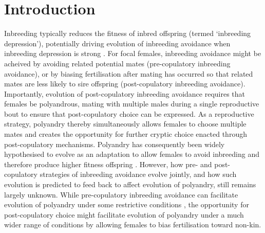 \documentclass[10pt,letterpaper]{article}
\begin{document}
\section*{Introduction}

Inbreeding typically reduces the fitness of inbred offspring (termed `inbreeding depression'), potentially driving evolution of inbreeding avoidance when inbreeding depression is strong \cite[][]{Parker1979, Parker2006, Pusey1996, Charlesworth1999, Keller2002, Charlesworth2009, Szulkin2012}. For focal females, inbreeding avoidance might be acheived by avoiding related potential mates (pre-copulatory inbreeding avoidance), or by biasing fertilisation after mating has occurred so that related mates are less likely to sire offspring (post-copulatory inbreeding avoidance). Importantly, evolution of post-copulatory inbreeding avoidance requires that females be polyandrous, mating with multiple males during a single reproductive bout to ensure that post-copulatory choice can be expressed. As a reproductive strategy, polyandry thereby simultaneously allows females to choose multiple mates and creates the opportunity for further cryptic choice enacted through post-copulatory mechanisms. Polyandry has consequently been widely hypothesised to evolve as an adaptation to allow females to avoid inbreeding and therefore produce higher fitness offspring \cite[][]{Zeh1997, Jennions2000, Tregenza2002, Akcay2007}. However, how pre- and post-copulatory strategies of inbreeding avoidance evolve jointly, and how such evolution is predicted to feed back to affect evolution of polyandry, still remains largely unknown. While pre-copulatory inbreeding avoidance can facilitate evolution of polyandry under some restrictive conditions \cite[][]{Duthie}, the opportunity for post-copulatory choice might facilitate evolution of polyandry under a much wider range of conditions by allowing females to bias fertilisation toward non-kin. 
\end{document}

